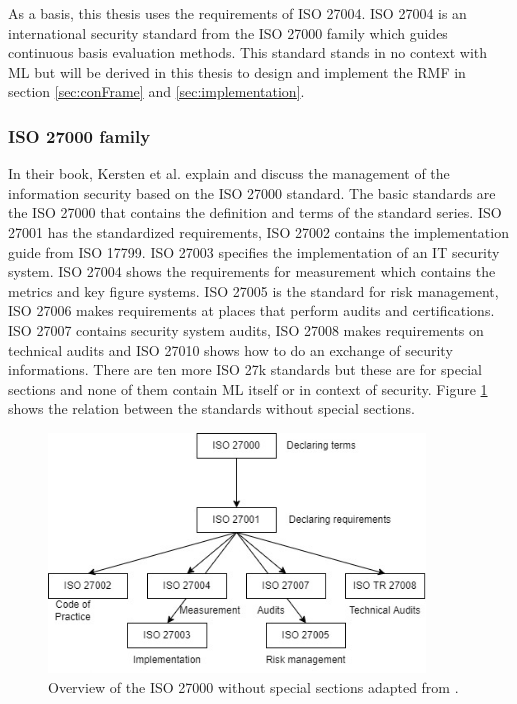 As a basis, this thesis uses the requirements of ISO 27004. ISO 27004 is an international security standard from the ISO 27000 family which guides continuous basis evaluation methods. This standard stands in no context with ML but will be derived in this thesis to design and implement the RMF in section \ref{sec:conFrame} and \ref{sec:implementation}.

\subsubsection*{ISO 27000 family}

In their book, Kersten et al. \cite{kersten_reuter_schroeder_wolfenstetter_2013} explain and discuss the management of the information security based on the ISO 27000 standard. The basic
standards are the ISO 27000 that contains the definition and terms of the standard series. ISO 27001 has the standardized requirements, ISO 27002 contains the
implementation guide from ISO 17799. ISO 27003 specifies the implementation of an IT security system. ISO 27004 shows the requirements for measurement which contains the metrics and key
figure systems. ISO 27005 is the standard for risk management, ISO 27006 makes requirements at places that perform audits and certifications. ISO 27007 contains security system audits, ISO 27008 makes requirements on technical audits and ISO 27010 shows how to do an exchange of security informations. There are ten more ISO 27k standards but these are for special sections and none of them contain ML itself or in context of security. Figure \ref{fig:standard_relations} shows the relation between the standards without special sections.

\begin{figure}[ht!]
  \centering
  \includegraphics[width=10cm]{pictures/standard_relations.jpg}
  \caption{Overview of the ISO 27000 without special sections adapted from \cite{kersten_reuter_schroeder_wolfenstetter_2013}.}
  \label{fig:standard_relations}
\end{figure}

